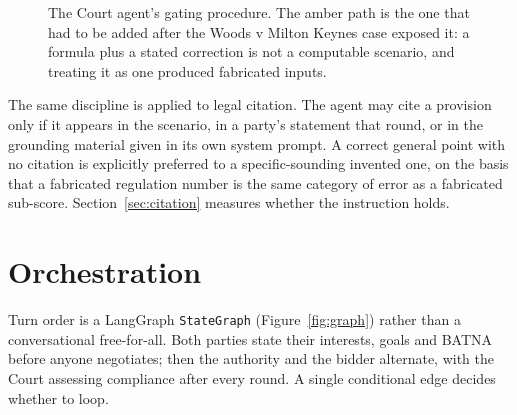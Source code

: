 \begin{figure}[htbp]
\caption[Court agent decision procedure]{The Court agent's gating procedure. The
amber path is the one that had to be added after the Woods v Milton Keynes case
exposed it: a formula plus a stated correction is not a computable scenario, and
treating it as one produced fabricated inputs.}
\label{fig:court-flow}
\end{figure}

The same discipline is applied to legal citation. The agent may cite a provision
only if it appears in the scenario, in a party's statement that round, or in the
grounding material given in its own system prompt. A correct general point with no
citation is explicitly preferred to a specific-sounding invented one, on the basis
that a fabricated regulation number is the same category of error as a fabricated
sub-score. Section~\ref{sec:citation} measures whether the instruction holds.

\section{Orchestration}
\label{sec:orchestration}

Turn order is a LangGraph \texttt{StateGraph} (Figure~\ref{fig:graph}) rather than
a conversational free-for-all. Both parties state their interests, goals and BATNA
before anyone negotiates; then the authority and the bidder alternate, with the
Court assessing compliance after every round. A single conditional edge decides
whether to loop.

